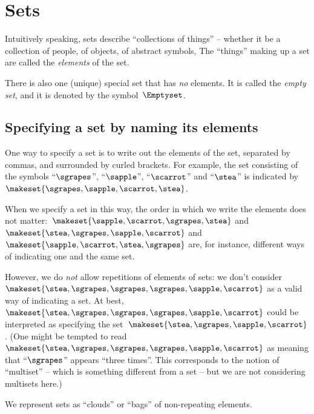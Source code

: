 
\section{Sets}

Intuitively speaking, sets describe ``collections of things'' -- whether it be a collection of people, of objects, of abstract symbols, \etc
The ``things'' making up a set are called the \emph{elements} of the set.

There is also one (unique) special set that has \emph{no} elements.
It is called the \emph{empty set}, and it is denoted by the symbol~$\Emptyset$.

\subsection{Specifying a set by naming its elements}

One way to specify a set is to write out the elements of the set, separated by commas, and surrounded by curled brackets.
For example, the set consisting of the symbols ``$\sgrapes$'', ``$\sapple$'', ``$\scarrot$'' and ``$\stea$'' is indicated by~$\makeset{ \sgrapes, \sapple, \scarrot, \stea}$.

When we specify a set in this way, the order in which we write the elements does not matter:~$\makeset{ \sapple, \scarrot, \sgrapes, \stea}$ and~$\makeset{ \stea, \sgrapes, \sapple, \scarrot}$ and~$\makeset{ \sapple, \scarrot, \stea, \sgrapes}$ are, for instance, different ways of indicating one and the same set.

However, we do \emph{not} allow repetitions of elements of sets: we don't consider~$\makeset{ \stea, \sgrapes, \sgrapes, \sgrapes, \sapple, \scarrot }$ as a valid way of indicating a set.
At best,~$\makeset{ \stea, \sgrapes, \sgrapes, \sgrapes, \sapple, \scarrot }$ could be interpreted as specifying the set~$\makeset{ \stea, \sgrapes, \sapple, \scarrot }$.
(One might be tempted to read $\makeset{ \stea, \sgrapes, \sgrapes, \sgrapes, \sapple, \scarrot }$ as meaning that ``$\sgrapes$'' appears ``three times''.
This corresponds to the notion of ``multiset'' -- which is something different from a set -- but we are not considering multisets here.)

\begin{marginfigure}
    \centering
    \caption{We represent sets as ``clouds'' or ``bags'' of non-repeating elements.}
    \label{fig:set_as_clouds}
\end{marginfigure}


